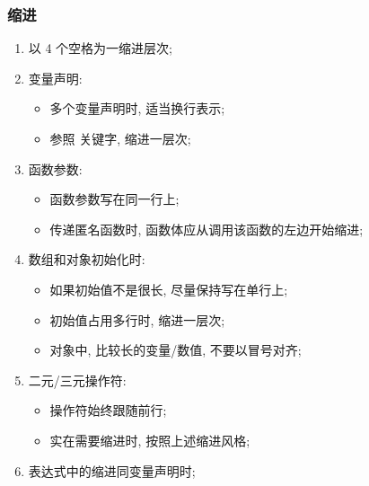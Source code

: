 \documentclass[letterpaper,10pt,english]{sphinxmanual}
\begin{document}
\subsubsection{缩进}
\label{styleguide/js-style-rules:id5}\begin{enumerate}
\item {}
以 4 个空格为一缩进层次;

\item {}
变量声明:
\begin{itemize}
\item {}
多个变量声明时, 适当换行表示;

\item {}
参照  关键字, 缩进一层次;

\end{itemize}

\item {}
函数参数:
\begin{itemize}
\item {}
函数参数写在同一行上;

\item {}
传递匿名函数时, 函数体应从调用该函数的左边开始缩进;

\end{itemize}

\item {}
数组和对象初始化时:
\begin{itemize}
\item {}
如果初始值不是很长, 尽量保持写在单行上;

\item {}
初始值占用多行时, 缩进一层次;

\item {}
对象中, 比较长的变量/数值, 不要以冒号对齐;

\end{itemize}

\item {}
二元/三元操作符:
\begin{itemize}
\item {}
操作符始终跟随前行;

\item {}
实在需要缩进时, 按照上述缩进风格;

\end{itemize}

\item {}
表达式中的缩进同变量声明时;

\end{enumerate}
\end{document}
